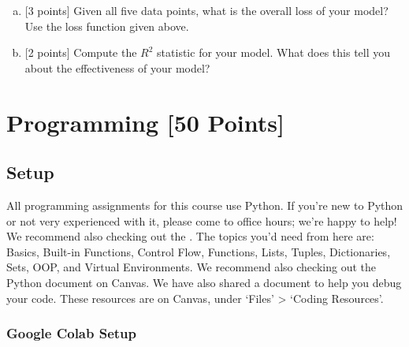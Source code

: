 \documentclass{homework}
\begin{document}
\begin{enumerate}[(a)]
    \vspace{250px}

    \item {[3 points]} Given all five data points, what is the overall loss of your model? Use the loss function given above.

    \vspace{200px}
    
    \item {[2 points]} Compute the $R^2$ statistic for your model. What does this tell you about the effectiveness of your model?

    \vspace{200px}

    

\end{enumerate}

\newpage

\section{Programming [50 Points]} 

\subsection{Setup}
All programming assignments for this course use Python. If you're new to Python or not very experienced with it, please come to office hours; we're happy to help! We recommend also checking out the \href{https://www.pythoncheatsheet.org/}{\color{blue}{Python Cheatsheet}}. The topics you'd need from here are: Basics, Built-in Functions, Control Flow, Functions, Lists, Tuples, Dictionaries, Sets, OOP, and Virtual Environments. We recommend also checking out the Python \href{https://umich.instructure.com/courses/730129/files/folder/Coding%20Resources?preview=39232639}{\color{blue}{Resources}} document on Canvas. We have also shared a document \href{https://umich.instructure.com/courses/730129/files/folder/Coding%20Resources?preview=39232633}{\color{blue}{Debugging Tips}} to help you debug your code. These resources are on Canvas, under `Files' > `Coding Resources'.

\subsubsection{Google Colab Setup}
\end{document}
